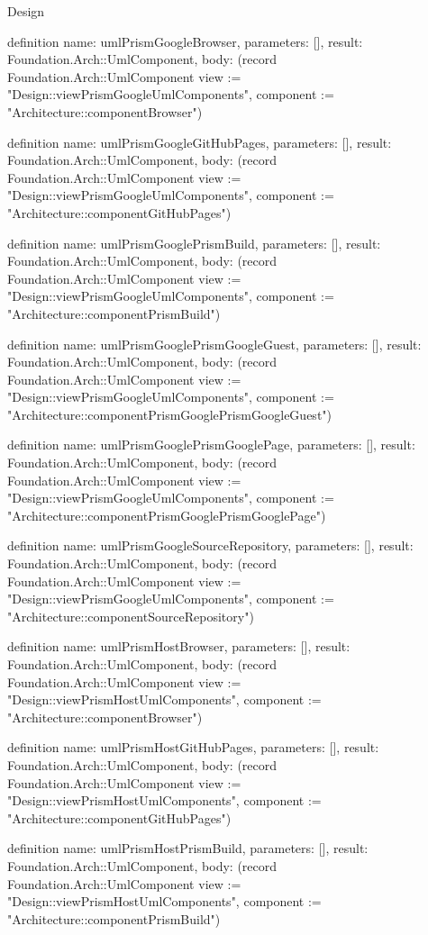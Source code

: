 \begin{lexlean}{Design}
\begin{semanticmodule}
definition{
  name: umlPrismGoogleBrowser,
  parameters: [],
  result: Foundation.Arch::UmlComponent,
  body: (record Foundation.Arch::UmlComponent {view := "Design::viewPrismGoogleUmlComponents", component := "Architecture::componentBrowser"})
}

definition{
  name: umlPrismGoogleGitHubPages,
  parameters: [],
  result: Foundation.Arch::UmlComponent,
  body: (record Foundation.Arch::UmlComponent {view := "Design::viewPrismGoogleUmlComponents", component := "Architecture::componentGitHubPages"})
}

definition{
  name: umlPrismGooglePrismBuild,
  parameters: [],
  result: Foundation.Arch::UmlComponent,
  body: (record Foundation.Arch::UmlComponent {view := "Design::viewPrismGoogleUmlComponents", component := "Architecture::componentPrismBuild"})
}

definition{
  name: umlPrismGooglePrismGoogleGuest,
  parameters: [],
  result: Foundation.Arch::UmlComponent,
  body: (record Foundation.Arch::UmlComponent {view := "Design::viewPrismGoogleUmlComponents", component := "Architecture::componentPrismGooglePrismGoogleGuest"})
}

definition{
  name: umlPrismGooglePrismGooglePage,
  parameters: [],
  result: Foundation.Arch::UmlComponent,
  body: (record Foundation.Arch::UmlComponent {view := "Design::viewPrismGoogleUmlComponents", component := "Architecture::componentPrismGooglePrismGooglePage"})
}

definition{
  name: umlPrismGoogleSourceRepository,
  parameters: [],
  result: Foundation.Arch::UmlComponent,
  body: (record Foundation.Arch::UmlComponent {view := "Design::viewPrismGoogleUmlComponents", component := "Architecture::componentSourceRepository"})
}

definition{
  name: umlPrismHostBrowser,
  parameters: [],
  result: Foundation.Arch::UmlComponent,
  body: (record Foundation.Arch::UmlComponent {view := "Design::viewPrismHostUmlComponents", component := "Architecture::componentBrowser"})
}

definition{
  name: umlPrismHostGitHubPages,
  parameters: [],
  result: Foundation.Arch::UmlComponent,
  body: (record Foundation.Arch::UmlComponent {view := "Design::viewPrismHostUmlComponents", component := "Architecture::componentGitHubPages"})
}

definition{
  name: umlPrismHostPrismBuild,
  parameters: [],
  result: Foundation.Arch::UmlComponent,
  body: (record Foundation.Arch::UmlComponent {view := "Design::viewPrismHostUmlComponents", component := "Architecture::componentPrismBuild"})
}


\end{semanticmodule}
\end{lexlean}

